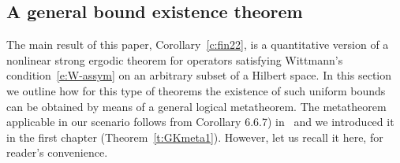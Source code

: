 \subsection{A general bound existence theorem}\label{s:Meta}

The main result of this paper, Corollary~\ref{c:fin22}, is a quantitative version
of a nonlinear strong ergodic theorem for 
operators satisfying Wittmann's condition~\eqref{e:W-assym} 
on an arbitrary subset of a Hilbert space. In this section
we outline how for this type of theorems the existence of such uniform bounds 
can be obtained by means of a general logical metatheorem. 
The metatheorem applicable
in our scenario follows from Corollary 6.6.7) in~\cite{GK08} and we introduced
it in the first chapter (Theorem~\ref{t:GKmeta1}). However, let us recall it here, for reader's convenience.\\

